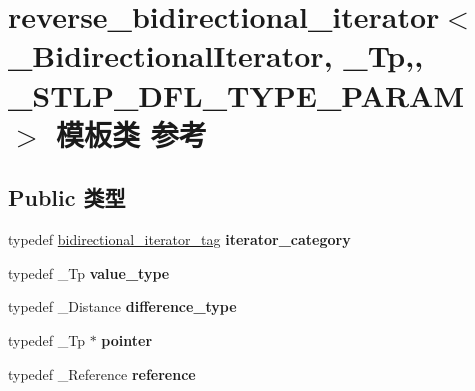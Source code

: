 \hypertarget{classreverse__bidirectional__iterator}{}\section{reverse\+\_\+bidirectional\+\_\+iterator$<$ \+\_\+\+Bidirectional\+Iterator, \+\_\+\+Tp,, \+\_\+\+S\+T\+L\+P\+\_\+\+D\+F\+L\+\_\+\+T\+Y\+P\+E\+\_\+\+P\+A\+R\+AM $>$ 模板类 参考}
\label{classreverse__bidirectional__iterator}
\subsection*{Public 类型}
\begin{DoxyCompactItemize}
\item 
\mbox{\label{classreverse__bidirectional__iterator_aa5dc0747dbe8da3d482ac4091012a453}} 
typedef \hyperlink{structbidirectional__iterator__tag}{bidirectional\+\_\+iterator\+\_\+tag} {\bfseries iterator\+\_\+category}
\item 
\mbox{\label{classreverse__bidirectional__iterator_a173a531c3b65ef3fc84db4cbef8f1b99}} 
typedef \+\_\+\+Tp {\bfseries value\+\_\+type}
\item 
\mbox{\label{classreverse__bidirectional__iterator_a26293767f47017d32d17af5649f0514c}} 
typedef \+\_\+\+Distance {\bfseries difference\+\_\+type}
\item 
\mbox{\label{classreverse__bidirectional__iterator_a98938ecff3a7608e11a1440a6d92094b}} 
typedef \+\_\+\+Tp $\ast$ {\bfseries pointer}
\item 
\mbox{\label{classreverse__bidirectional__iterator_a0dec442c1fd0695f29530384734d27ec}} 
typedef \+\_\+\+Reference {\bfseries reference}
\end{DoxyCompactItemize}

